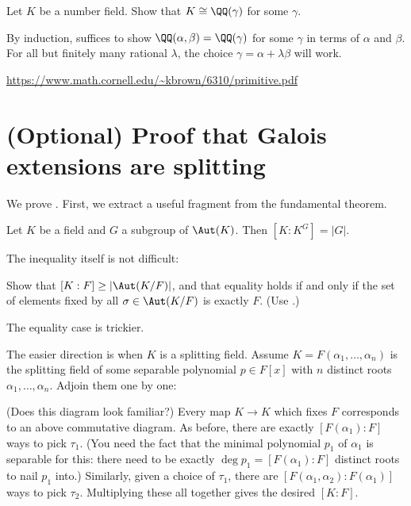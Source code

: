 \begin{problem}
	\yod
	Let $K$ be a number field.
	Show that $K \cong \QQ(\gamma)$ for some $\gamma$.
	\label{prob:artin_primitive_elm}
	\begin{hint}
		By induction, suffices to show $\QQ(\alpha, \beta) = \QQ(\gamma)$
		for some $\gamma$ in terms of $\alpha$ and $\beta$.
		For all but finitely many rational $\lambda$,
		the choice $\gamma = \alpha + \lambda \beta$ will work.
	\end{hint}
	\begin{sol}
		\url{https://www.math.cornell.edu/~kbrown/6310/primitive.pdf}
	\end{sol}
\end{problem}

\section{(Optional) Proof that Galois extensions are splitting}
We prove .
First, we extract a useful fragment from the fundamental theorem.
\begin{theorem}
	\label{thm:fixed_field_theorem}
	Let $K$ be a field and $G$ a subgroup of $\Aut(K)$.
	Then $[K:K^G] = \left\lvert G \right\rvert$.
\end{theorem}

The inequality itself is not difficult:
\begin{exercise}
	Show that $[K:F] \ge |\Aut(K/F)|$,
	and that equality holds if and only if
	the set of elements fixed by all $\sigma \in \Aut(K/F)$
	is exactly $F$.
	(Use .)
\end{exercise}
The equality case is trickier.

The easier direction is when $K$ is a splitting field.
Assume $K = F(\alpha_1, \dots, \alpha_n)$ is the splitting field of some separable polynomial $p \in F[x]$
with $n$ distinct roots $\alpha_1, \dots, \alpha_n$.
Adjoin them one by one:
\begin{center}
\end{center}
(Does this diagram look familiar?)
Every map $K \to K$ which fixes $F$ corresponds to an above commutative diagram.
As before, there are exactly $[F(\alpha_1) : F]$ ways to pick $\tau_1$.
(You need the fact that the minimal polynomial $p_1$ of $\alpha_1$ is separable for this:
there need to be exactly $\deg p_1 = [F(\alpha_1) : F]$ distinct roots to nail $p_1$ into.)
Similarly, given a choice of $\tau_1$, there are $[F(\alpha_1, \alpha_2) : F(\alpha_1)]$ ways to pick $\tau_2$.
Multiplying these all together gives the desired $[K:F]$.

